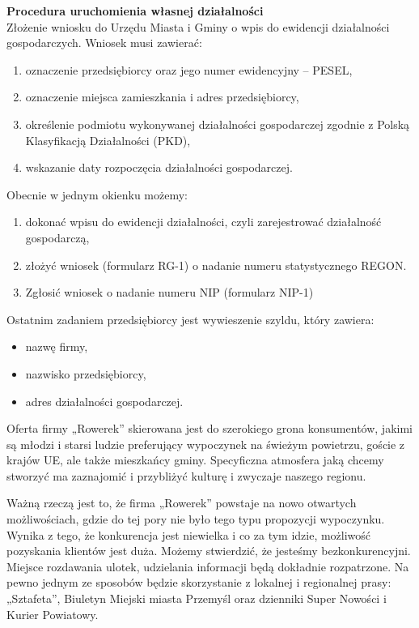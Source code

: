 \documentclass{sprawozdanie-agh}
\begin{document}
		\textbf{Procedura uruchomienia własnej działalności}\\
		Złożenie wniosku do Urzędu Miasta i Gminy o wpis do ewidencji działalności gospodarczych.
		Wniosek musi zawierać:
		\begin{enumerate}
			\item oznaczenie przedsiębiorcy oraz jego numer ewidencyjny – PESEL,
			\item oznaczenie miejsca zamieszkania i adres przedsiębiorcy,
			\item określenie podmiotu wykonywanej działalności gospodarczej zgodnie z Polską Klasyfikacją Działalności (PKD),
			\item wskazanie daty rozpoczęcia działalności gospodarczej.
		\end{enumerate}
		Obecnie w jednym okienku możemy:
		\begin{enumerate}
			\item dokonać wpisu do ewidencji działalności, czyli zarejestrować działalność gospodarczą,
			\item złożyć wniosek (formularz RG-1) o nadanie numeru statystycznego REGON.
			\item Zgłosić wniosek o nadanie numeru NIP (formularz NIP-1)
		\end{enumerate}
		Ostatnim zadaniem przedsiębiorcy jest wywieszenie szyldu, który zawiera:
		\begin{itemize}
			\item nazwę firmy,
			\item nazwisko przedsiębiorcy,
			\item adres działalności gospodarczej.
		\end{itemize}
	
		Oferta firmy „Rowerek” skierowana jest do szerokiego grona konsumentów, jakimi są młodzi i starsi ludzie preferujący wypoczynek na świeżym powietrzu, goście z krajów UE, ale także mieszkańcy gminy. Specyficzna atmosfera jaką chcemy stworzyć ma zaznajomić i przybliżyć kulturę i zwyczaje naszego regionu.
		
		Ważną rzeczą jest to, że firma „Rowerek” powstaje na nowo otwartych możliwościach, gdzie do tej pory nie było tego typu propozycji wypoczynku. Wynika z tego, że konkurencja jest niewielka i co za tym idzie, możliwość pozyskania klientów jest duża. Możemy stwierdzić, że jesteśmy bezkonkurencyjni. Miejsce rozdawania ulotek, udzielania informacji będą dokładnie rozpatrzone. Na pewno jednym ze sposobów będzie skorzystanie z lokalnej i regionalnej prasy: „Sztafeta”, Biuletyn Miejski miasta Przemyśl oraz dzienniki Super Nowości i Kurier Powiatowy.
		
\end{document}
